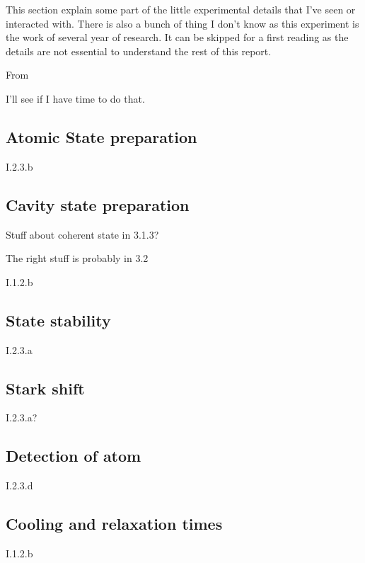 \documentclass[10pt]{report}
\theoremstyle{plain}
\theoremstyle{definition}
\theoremstyle{remark}
\begin{document}
This section explain some part of the little experimental details that I've seen
or interacted with. There is also a bunch of thing I don't know as this
experiment is the work of several year of research. It can be skipped for a
first reading as the details are not essential to understand the rest of this report.

From~\cite{SayPHD11}

I'll see if I have time to do that.


\subsection{Atomic State preparation}

I.2.3.b



\subsection{Cavity state preparation}

Stuff about coherent state in 3.1.3?

The right stuff is probably in 3.2

I.1.2.b

\subsection{State stability}\label{ssec:ststab}

I.2.3.a

\subsection{Stark shift}

I.2.3.a?

\subsection{Detection of atom}

I.2.3.d


\subsection{Cooling and relaxation times}

I.1.2.b
\end{document}
